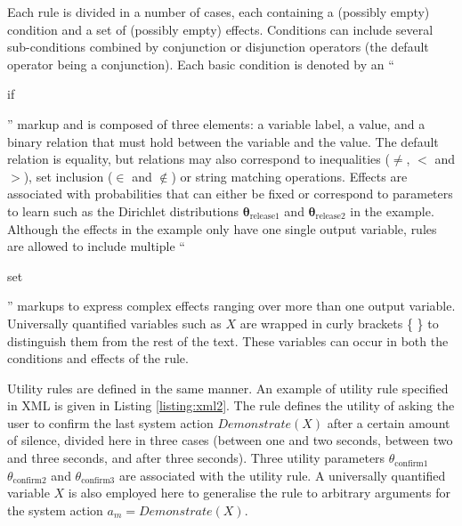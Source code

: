 Each rule is divided in a number of cases, each containing a (possibly empty) condition and a set of (possibly empty) effects.  Conditions can include several sub-conditions combined by conjunction or disjunction operators (the default operator being a conjunction). Each basic condition is denoted by an ``\begin{small}\textsf{if}\end{small}'' markup and is composed of three elements: a variable label, a value, and a binary relation that must hold between the variable and the value. The default relation is equality, but relations may also correspond to inequalities ($\neq$, $<$ and $>$), set inclusion ($\in$ and $\notin$) or string matching operations.   Effects are associated with probabilities that can either be fixed or correspond to parameters to learn such as the Dirichlet distributions $\boldsymbol\theta_{\text{release1}}$ and $\boldsymbol\theta_{\text{release2}}$ in the example.  Although the effects in the example only have one single output variable, rules are allowed to include multiple ``\begin{small}\textsf{set}\end{small}'' markups to express complex effects ranging over more than one output variable. Universally quantified variables such as $X$ are wrapped in curly brackets \{ \} to distinguish them from the rest of the text. These variables can occur in both the conditions and effects of the rule. 

Utility rules are defined in the same manner.  An example of utility rule specified in XML is given in Listing \ref{listing:xml2}.  The rule defines the utility of asking the user to confirm the last system action $\mathit{Demonstrate}(X)$ after a certain amount of silence, divided here in three cases (between one and two seconds, between two and three seconds, and after three seconds).  Three utility parameters $\theta_{\text{confirm1}}$ $\theta_{\text{confirm2}}$ and $\theta_{\text{confirm3}}$ are associated with the utility rule.  A universally quantified variable $X$ is also employed here to generalise the rule to arbitrary arguments for the system action $a_m = \mathit{Demonstrate}(X)$. 

